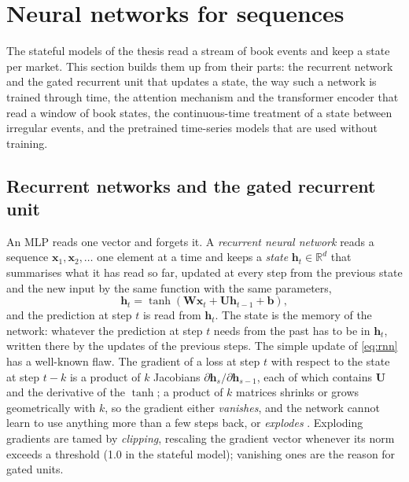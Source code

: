 \section{Neural networks for sequences}
\label{sec:bg:sequences}

The stateful models of the thesis read a stream of book events and keep a state per
market.  This section builds them up from their parts: the recurrent network and the gated
recurrent unit that updates a state, the way such a network is trained through time, the
attention mechanism and the transformer encoder that read a window of book states, the
continuous-time treatment of a state between irregular events, and the pretrained
time-series models that are used without training.

\subsection{Recurrent networks and the gated recurrent unit}
\label{sec:bg:rnn}

An MLP reads one vector and forgets it.  A \emph{recurrent neural network} reads a
sequence $\mathbf{x}_1, \mathbf{x}_2, \ldots$ one element at a time and keeps a
\emph{state} $\mathbf{h}_t \in \mathbb{R}^{d}$ that summarises what it has read so far,
updated at every step from the previous state and the new input by the same function with
the same parameters,
\begin{equation}
  \mathbf{h}_t = \tanh(\mathbf{W} \mathbf{x}_t + \mathbf{U} \mathbf{h}_{t-1} + \mathbf{b}),
  \label{eq:rnn}
\end{equation}
and the prediction at step $t$ is read from $\mathbf{h}_t$.  The state is the memory of
the network: whatever the prediction at step $t$ needs from the past has to be in
$\mathbf{h}_t$, written there by the updates of the previous steps.  The simple update of
\cref{eq:rnn} has a well-known flaw.  The gradient of a loss at step $t$ with respect to
the state at step $t - k$ is a product of $k$ Jacobians $\partial \mathbf{h}_{s} /
\partial \mathbf{h}_{s-1}$, each of which contains $\mathbf{U}$ and the derivative of the
$\tanh$; a product of $k$ matrices shrinks or grows geometrically with $k$, so the
gradient either \emph{vanishes}, and the network cannot learn to use anything more than a
few steps back, or \emph{explodes} \cite{bengio1994vanishing,pascanu2013difficulty}.
Exploding gradients are tamed by \emph{clipping}, rescaling the gradient vector whenever
its norm exceeds a threshold (1.0 in the stateful model); vanishing ones are the reason for
gated units.

